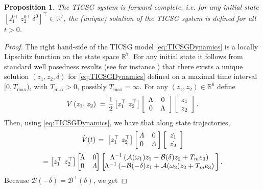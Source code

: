 \documentclass[letterpaper,10pt,conference]{ieeeconf}
\newtheorem{proposition}[theorem]{Proposition}
\newcommand{\BE}{\begin{equation}}
\newcommand{\BEQ}[1]{\BE\label{#1}} %
\newcommand{\rline}  {{\mathbb R}}
\renewcommand{\L}    {{\Lambda}}
\renewcommand{\o}    {{\omega}}
\newcommand{\half}   {{\frac{1}{2}}}
\newcommand{\m}      {{\hbox{\hskip 1pt}}}
\newcommand{\nm}     {{\hbox{\hskip -3pt}}}
\newcommand{\Amscr}  {{\mathcal{A}}}
\newcommand{\Bmscr}  {{\mathcal{B}}}
\begin{document}
\begin{proposition} \label{forwardComplete}
The TICSG system is forward complete, i.e. for any initial state
$\left[ z_1^{0\top} \ z_2^{0\top} \ \delta^{0} \right]^\top \in
\mathbb{R}^7 $, the (unique) solution of the TICSG system is defined
for all $t>0$.
\end{proposition}

\medskip
\begin{proof} The right hand-side of the TICSG model 
\eqref{eq:TICSGDynamics} is a locally Lipschitz function on the state
space $\rline^7$. For any initial state it follows from standard well
posedness results (see for instance \cite[Ch.~3]{Khalil}) that there
exists a unique solution $(z_1,z_2,\delta)$ for
\eqref{eq:TICSGDynamics} defined on a maximal time interval
$[0,{T_{\max}})$, with ${T_{\max}}>0$, possibly $T_{\max}=\infty$.
For any $(z_1,z_2)\in\rline^6$ define \vspace{-2mm} 
\BEQ{V} V\left(z_1,\m z_2\right)
   \m=\m \half \left[z_1^\top\ z_2^\top \right]\left[ \begin{array}
   {cc} \L & 0\\ 0 & \L\end{array} \right]\left[ \begin{array}{c}
    z_1\\ z_2\end{array}\right].
\end{equation}
Then, using \eqref{eq:TICSGDynamics}, we have that along state 
trajectories,
$$ \dot{V}(t) \m=\m \left[ z_1^\top\ z_2^\top\right]\left[\nm
   \begin{array}{cc} \varLambda & 0\\ 0 & \varLambda \end{array}
   \nm\right]\left[\begin{array}{c} \dot{z_1}\\ \dot{z_2}
   \end{array}\right]$$ 
$$ = \left[z_1^\top\ z_2^\top\right]\left[\nm\nm \begin{array}{cc}
   \L & 0\\ 0 & \varLambda \end{array} \nm\nm\right] \left[\nm\nm
   \begin{array}{c} \L^{-1} \left( \Amscr(\o_1)z_1-\Bmscr(\delta)
   z_2+T_me_3\right)\\ \L^{-1}\left(-\Bmscr(-\delta)z_1+\Amscr
   (\o_2)z_2+T_m e_3\right) \end{array}\nm\right].$$
Because $\Bmscr(-\delta)=\Bmscr^\top(\delta)$, we get 

\end{proof}
\end{document}

